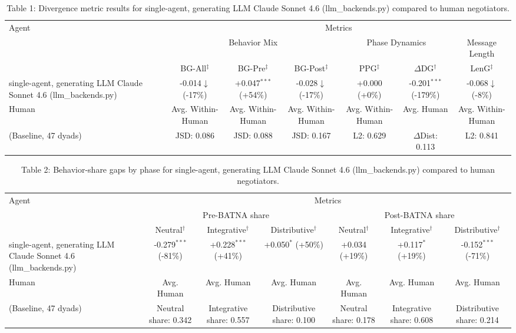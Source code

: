 \begin{table}[t]
\centering
\begin{tabular}{lcccccc}
\toprule
\multirow{3}{*}{Agent} & \multicolumn{6}{c}{Metrics} \\
\cmidrule(lr){2-7}
 & \multicolumn{3}{c}{Behavior Mix} & \multicolumn{2}{c}{Phase Dynamics} & \multicolumn{1}{c}{Message Length} \\
\cmidrule(lr){2-4} \cmidrule(lr){5-6} \cmidrule(lr){7-7}
 & BG-All$^\ddagger$ & BG-Pre$^\ddagger$ & BG-Post$^\ddagger$ & PPG$^\ddagger$ & $\Delta$DG$^\dagger$ & LenG$^\ddagger$ \\
\midrule
single-agent, generating LLM Claude Sonnet 4.6 (llm_backends.py) & -0.014$\downarrow$ (-17\%) & +0.047$^{***}$ (+54\%) & -0.028$\downarrow$ (-17\%) & +0.000 (+0\%) & -0.201$^{***}$ (-179\%) & -0.068$\downarrow$ (-8\%) \\
\midrule
Human & Avg. Within-Human & Avg. Within-Human & Avg. Within-Human & Avg. Within-Human & Avg. Human & Avg. Within-Human \\
(Baseline, 47 dyads) & JSD: 0.086 & JSD: 0.088 & JSD: 0.167 & L2: 0.629 & $\Delta$Dist: 0.113 & L2: 0.841 \\
\bottomrule
\end{tabular}
\caption{Table 1: Divergence metric results for single-agent, generating LLM Claude Sonnet 4.6 (llm_backends.py) compared to human negotiators.}
\end{table}

\begin{table}[t]
\centering
\begin{tabular}{lcccccc}
\toprule
\multirow{3}{*}{Agent} & \multicolumn{6}{c}{Metrics} \\
\cmidrule(lr){2-7}
 & \multicolumn{3}{c}{Pre-BATNA share} & \multicolumn{3}{c}{Post-BATNA share} \\
\cmidrule(lr){2-4} \cmidrule(lr){5-7}
 & Neutral$^\dagger$ & Integrative$^\dagger$ & Distributive$^\dagger$ & Neutral$^\dagger$ & Integrative$^\dagger$ & Distributive$^\dagger$ \\
\midrule
single-agent, generating LLM Claude Sonnet 4.6 (llm_backends.py) & -0.279$^{***}$ (-81\%) & +0.228$^{***}$ (+41\%) & +0.050$^{*}$ (+50\%) & +0.034 (+19\%) & +0.117$^{*}$ (+19\%) & -0.152$^{***}$ (-71\%) \\
\midrule
Human & Avg. Human & Avg. Human & Avg. Human & Avg. Human & Avg. Human & Avg. Human \\
(Baseline, 47 dyads) & Neutral share: 0.342 & Integrative share: 0.557 & Distributive share: 0.100 & Neutral share: 0.178 & Integrative share: 0.608 & Distributive share: 0.214 \\
\bottomrule
\end{tabular}
\caption{Table 2: Behavior-share gaps by phase for single-agent, generating LLM Claude Sonnet 4.6 (llm_backends.py) compared to human negotiators.}
\end{table}
